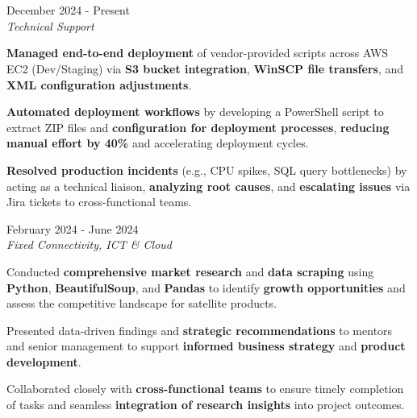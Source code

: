 \documentclass[../main.tex]{subfiles}
\begin{document}
\section{}

\begin{twocolentry}{December 2024 - Present}
     \\
    \vspace{0.10 cm}
    \textit{Technical Support}
\end{twocolentry}

\vspace{0.10 cm}
\begin{onecolentry}
\begin{highlights}
    \item \textbf{Managed end-to-end deployment} of vendor-provided scripts across AWS EC2 (Dev/Staging) via \textbf{S3 bucket integration}, \textbf{WinSCP file transfers}, and \textbf{XML configuration adjustments}.
    \item \textbf{Automated deployment workflows} by developing a PowerShell script to extract ZIP files and \textbf{configuration for deployment processes}, \textbf{reducing manual effort by 40\%} and accelerating deployment cycles.
    \item \textbf{Resolved production incidents} (e.g., CPU spikes, SQL query bottlenecks) by acting as a technical liaison, \textbf{analyzing root causes}, and \textbf{escalating issues} via Jira tickets to cross-functional teams.
\end{highlights}
\end{onecolentry}

\vspace{0.4 cm}

\begin{twocolentry}{February 2024 - June 2024}
     \\
    \vspace{0.10 cm}
    \textit{Fixed Connectivity, ICT \& Cloud}
\end{twocolentry}

\vspace{0.10 cm}
\begin{onecolentry}
\begin{highlights}
    \item Conducted \textbf{comprehensive market research} and \textbf{data scraping} using \textbf{Python}, \textbf{BeautifulSoup}, and \textbf{Pandas} to identify \textbf{growth opportunities} and assess the competitive landscape for satellite products.
    \item Presented data-driven findings and \textbf{strategic recommendations} to mentors and senior management to support \textbf{informed business strategy} and \textbf{product development}.
    \item Collaborated closely with \textbf{cross-functional teams} to ensure timely completion of tasks and seamless \textbf{integration of research insights} into project outcomes.
\end{highlights}
\end{onecolentry}
\end{document}
